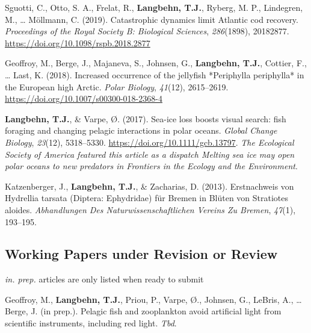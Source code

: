 \documentclass[11pt, a4paper]{awesome-cv}
\begin{document}
\leavevmode\hypertarget{ref-Sguotti}{}%
Sguotti, C., Otto, S. A., Frelat, R., \textbf{Langbehn, T.J.}, Ryberg,
M. P., Lindegren, M., \ldots{} Möllmann, C. (2019). Catastrophic
dynamics limit Atlantic cod recovery. \emph{Proceedings of the Royal
Society B: Biological Sciences}, \emph{286}(1898), 20182877.
\url{https://doi.org/10.1098/rspb.2018.2877}

\leavevmode\hypertarget{ref-Geoffroy2018}{}%
Geoffroy, M., Berge, J., Majaneva, S., Johnsen, G.,
\textbf{Langbehn, T.J.}, Cottier, F., \ldots{} Last, K. (2018).
Increased occurrence of the jellyfish *Periphylla periphylla* in the
European high Arctic. \emph{Polar Biology}, \emph{41}(12), 2615--2619.
\url{https://doi.org/10.1007/s00300-018-2368-4}

\leavevmode\hypertarget{ref-Langbehn2017}{}%
\textbf{Langbehn, T.J.}, \& Varpe, Ø. (2017). Sea-ice loss boosts visual
search: fish foraging and changing pelagic interactions in polar oceans.
\emph{Global Change Biology}, \emph{23}(12), 5318--5330.
\url{https://doi.org/10.1111/gcb.13797}. \emph{The Ecological Society of
America featured this article as a dispatch Melting sea ice may open
polar oceans to new predators in Frontiers in the Ecology and the
Environment}.

\leavevmode\hypertarget{ref-Katzenberger2013}{}%
Katzenberger, J., \textbf{Langbehn, T.J.}, \& Zacharias, D. (2013).
Erstnachweis von Hydrellia tarsata (Diptera: Ephydridae) für Bremen in
Blüten von Stratiotes aloides. \emph{Abhandlungen Des
Naturwissenschaftlichen Vereins Zu Bremen}, \emph{47}(1), 193--195.

\endgroup

\hypertarget{working-papers-under-revision-or-review}{%
\subsection{Working Papers under Revision or
Review}\label{working-papers-under-revision-or-review}}

\emph{in. prep.} articles are only listed when ready to submit

\begingroup
\setlength{\parindent}{-0.5in}
\setlength{\leftskip}{0.5in}

\hypertarget{refs_working_paper}{}
\leavevmode\hypertarget{ref-Geoffroy}{}%
Geoffroy, M., \textbf{Langbehn, T.J.}, Priou, P., Varpe, Ø., Johnsen,
G., LeBris, A., \ldots{} Berge, J. (in prep.). Pelagic fish and
zooplankton avoid artificial light from scientific instruments,
including red light. \emph{Tbd}.
\end{document}
